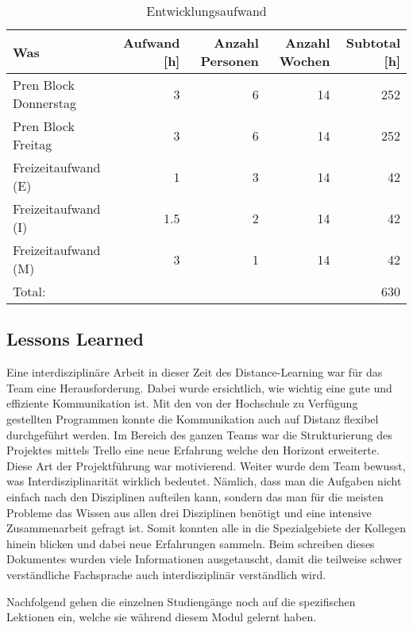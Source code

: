 \begin{center}
\begin{table}[H]
\begin{tabular}{|l|r|r|r|r|}
\hline
\textbf {Was} & \textbf{Aufwand [h]} &
\textbf{Anzahl Personen} & \textbf{Anzahl Wochen} & \textbf{Subtotal [h]}\\
\hline
Pren Block Donnerstag & 3 & 6 & 14 & 252 \\
\hline
Pren Block Freitag & 3 & 6 & 14 & 252 \\
\hline
Freizeitaufwand (E) & 1 & 3 & 14 & 42 \\
\hline
Freizeitaufwand (I) & 1.5 & 2 & 14 & 42 \\
\hline
Freizeitaufwand (M) & 3 & 1 & 14 & 42 \\
\hline
Total: & & & & 630 \\ \hline
\end{tabular}
\caption[Entwicklungsaufwand]{Entwicklungsaufwand}
\label{tab:entwicklungsaufwand}
\end{table}
\end{center}

\subsection{Lessons Learned}
Eine interdisziplinäre Arbeit in dieser Zeit des Distance-Learning war für das Team eine Herausforderung. Dabei wurde ersichtlich, wie wichtig eine gute und effiziente Kommunikation ist. Mit den von der Hochschule zu Verfügung gestellten Programmen konnte die Kommunikation auch auf Distanz flexibel durchgeführt werden. Im Bereich des ganzen Teams war die Strukturierung des Projektes mittels Trello eine neue Erfahrung welche den Horizont erweiterte. Diese Art der Projektführung war motivierend. Weiter wurde dem Team bewusst, was Interdisziplinarität wirklich bedeutet. Nämlich, dass man die Aufgaben nicht einfach nach den Disziplinen aufteilen kann, sondern das man für die meisten Probleme das Wissen aus allen drei Disziplinen benötigt und eine intensive Zusammenarbeit gefragt ist. Somit konnten alle in die Spezialgebiete der Kollegen hinein blicken und dabei neue Erfahrungen sammeln. Beim schreiben dieses Dokumentes wurden viele Informationen ausgetauscht, damit die teilweise schwer verständliche Fachsprache auch interdisziplinär verständlich wird.

Nachfolgend gehen die einzelnen Studiengänge noch auf die spezifischen Lektionen ein, welche sie während diesem Modul gelernt haben.

